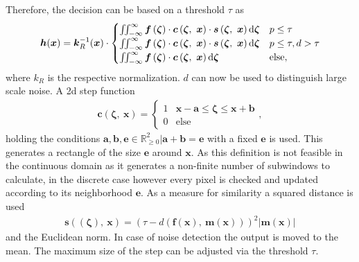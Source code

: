 Therefore, the decision can be based on a threshold $\tau$ as
\begin{eqnarray*}
  \bm{h}(\bm{x}) = \bm{k}^{-1}_R(\bm{x}) \cdot \begin{cases}
      \iint_{-\infty}^{\infty} \bm{f} \left( \bm{\zeta} \right) \cdot \bm{c} \left( \bm{\zeta},\ \bm{x} \right) \cdot \bm{s} \left( \bm{\zeta},\ \bm{x} \right) {\textrm d} \bm{\zeta} & p \leq \tau \\
      \iint_{-\infty}^{\infty} \bm{f} \left( \bm{\zeta} \right) \cdot \bm{c} \left( \bm{\zeta},\ \bm{x} \right) \cdot \bm{s} \left( \bm{\zeta},\ \bm{x} \right) {\textrm d} \bm{\zeta} & p \leq \tau, d > \tau\\
      \iint_{-\infty}^{\infty} \bm{f} \left( \bm{\zeta} \right) \cdot \bm{c} \left( \bm{\zeta},\ \bm{x} \right) {\textrm d} \bm{\zeta} & \textrm{else},
  \end{cases}
  \label{eq:continuous_output}
\end{eqnarray*}
where $k_R$ is the respective normalization. 
$d$ can now be used to distinguish large scale noise. 
A 2d step function
\begin{eqnarray}
  \bm{c} \left( \bm{\zeta},\ \bm{x} \right) = \begin{cases}
    1 & \bm{x} - \bm{a} \leq \bm{\zeta} \leq \bm{x} + \bm{b} \\
    0 & \textrm{else}
  \end{cases},
\end{eqnarray}
holding the conditions $\bm{a}, \bm{b}, \bm{e} \in \mathbb{R}^2_{\geq 0} | \bm{a} + \bm{b} = \bm{e}$ with a fixed $\bm{e}$ is used.
This generates a rectangle of the size $\bm{e}$ around $\bm{x}$. 
As this definition is not feasible in the continuous domain as it generates a non-finite number of subwindows to calculate, in the discrete case however every pixel is checked and updated according to its neighborhood $\bm{e}$.  
As a measure for similarity a squared distance is used
\begin{eqnarray}
  \bm{s}\left( \left(\bm{\zeta}\right),\ \bm{x} \right) = (\tau - d( \bm{f}(\bm{x}),\ \bm{m}(\bm{x}) ))^2 |\bm{m} (\bm{x})|
\end{eqnarray}
and the Euclidean norm. 
In case of noise detection the output is moved to the mean. 
The maximum size of the step can be adjusted via the threshold $\tau$. 





